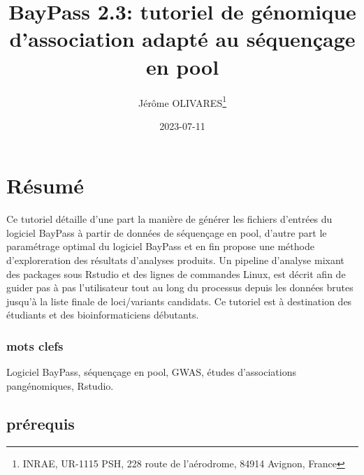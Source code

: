 \documentclass[
  openany]{book}
\title{BayPass 2.3: tutoriel de génomique d'association adapté au séquençage en pool}
\author{Jérôme OLIVARES\footnote{INRAE, UR-1115 PSH, 228 route de l'aérodrome, 84914 Avignon, France}}
\date{2023-07-11}
\theoremstyle{definition}
\theoremstyle{definition}
\theoremstyle{definition}
\theoremstyle{definition}
\theoremstyle{remark}
\begin{document}
\maketitle

{
\hypersetup{linkcolor=}
\setcounter{tocdepth}{1}
\tableofcontents
}
\hypertarget{ruxe9sumuxe9}{%
\chapter*{Résumé}\label{ruxe9sumuxe9}}

Ce tutoriel détaille d'une part la manière de générer les fichiers d'entrées du logiciel BayPass à partir de données de séquençage en pool, d'autre part le paramétrage optimal du logiciel BayPass et en fin propose une méthode d'exploreration des résultats d'analyses produits. Un pipeline d'analyse mixant des packages sous Rstudio et des lignes de commandes Linux, est décrit afin de guider pas à pas l'utilisateur tout au long du processus depuis les données brutes jusqu'à la liste finale de loci/variants candidats.
Ce tutoriel est à destination des étudiants et des bioinformaticiens débutants.

\hypertarget{mots-clefs}{%
\subsection*{mots clefs}\label{mots-clefs}}

Logiciel BayPass, séquençage en pool, GWAS, études d'associations pangénomiques, Rstudio.

\hypertarget{pruxe9requis}{%
\section*{prérequis}\label{pruxe9requis}}
\end{document}
